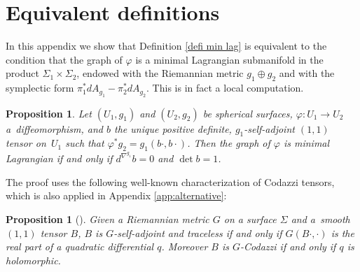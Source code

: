 \documentclass[11pt]{article}
\newtheorem{prop}[cor]{Proposition}
\theoremstyle{definition}
\begin{document}
\appendix

\section{Equivalent definitions}\label{app:defis}

In this appendix we show that Definition \ref{defi min lag} is equivalent to the condition that the graph of $\varphi$ is a minimal Lagrangian submanifold in the product $\Sigma_1\times\Sigma_2$, endowed with the Riemannian metric $g_1\oplus g_2$ and with the symplectic form $\pi_1^*dA_{g_1}-\pi_2^*dA_{g_2}$. This is in fact a local computation.

\begin{prop}\label{prop:app1}
Let $(U_1,g_1)$ and $(U_2,g_2)$ be spherical surfaces, $\varphi:U_1\to U_2$ a~diffeomorphism, and $b$ the unique positive definite, $g_1$-self-adjoint $(1,1)$ tensor on~$U_1$ such that $\varphi^*g_2=g_1(b\cdot,b\cdot)$. Then the graph of $\varphi$ is minimal Lagrangian if and only if $d^{\nabla^{g_1}}\!b=0$ and $\det b=1$.
\end{prop}

The proof uses the following well-known characterization of Codazzi tensors, which is also applied in Appendix \ref{app:alternative}:

\begin{prop}[{\cite{zbMATH03064601}}] \label{prop hopf}
Given a Riemannian metric $G$ on a surface $\Sigma$ and a~smooth $(1,1)$ tensor $B$, $B$ is $G$-self-adjoint and traceless if and only if $G(B\cdot,\cdot)$ is the real part of a quadratic differential $q$. Moreover $B$ is $G$-Codazzi if and only if $q$ is holomorphic.
\end{prop}
\end{document}

